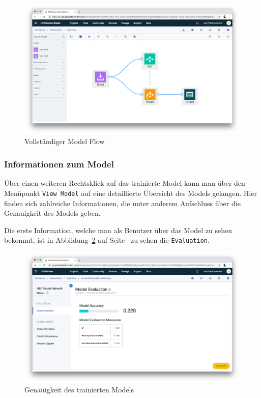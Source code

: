 \begin{figure}[h]
    \centering
    \includegraphics[width=\textwidth]{images/kapitel_3/umsetzung_model_flow.png}
    \caption{Vollständiger Model Flow}
    \label{fig:umsetzung_model_flow}
\end{figure}

\subsubsection{Informationen zum Model}
Über einen weiteren Rechtsklick auf das trainierte Model kann man über den Menüpunkt \texttt{View Model} auf eine
detaillierte Übersicht des Models gelangen. Hier finden sich zahlreiche Informationen, die unter anderem Aufschluss
über die Genauigkeit des Models geben.

Die erste Information, welche man als Benutzer über das Model zu sehen bekommt, ist in
Abbildung~\ref{fig:umsetzung_model_evaluation} auf Seite~\pageref{fig:umsetzung_model_evaluation} zu sehen \textendash{}
die \texttt{Evaluation}.

\begin{figure}[h]
    \centering
    \includegraphics[width=\textwidth]{images/kapitel_3/model_evaluation.png}
    \caption{Genauigkeit des trainierten Models}
    \label{fig:umsetzung_model_evaluation}
\end{figure}

